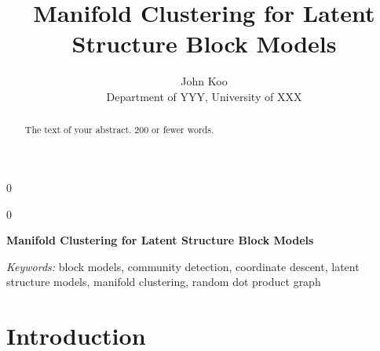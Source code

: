 \documentclass[12pt]{article}
\newcommand{\blind}{0}
\begin{document}
\def\spacingset#1{\renewcommand{\baselinestretch}%
{#1}\small\normalsize} \spacingset{1}



\blind
{
  \title{\bf Manifold Clustering for Latent Structure Block Models}

  \author{
        John Koo \\
    Department of YYY, University of XXX\\
      }
  \maketitle
} \fi

\blind
{
  \bigskip
  \bigskip
  \bigskip
  \begin{center}
    {\LARGE\bf Manifold Clustering for Latent Structure Block Models}
  \end{center}
  \medskip
} \fi

\bigskip
\begin{abstract}
The text of your abstract. 200 or fewer words.
\end{abstract}

\noindent%
{\it Keywords:} block models, community detection, coordinate descent,
latent structure models, manifold clustering, random dot product graph
\vfill

\newpage
\spacingset{1.45} %

\newcommand{\diag}{\mathrm{diag}}
\newcommand{\tr}{\mathrm{Tr}}
\newcommand{\blockdiag}{\mathrm{blockdiag}}
\newcommand{\indep}{\stackrel{\mathrm{ind}}{\sim}}
\newcommand{\iid}{\stackrel{\mathrm{iid}}{\sim}}
\newcommand{\Bernoulli}{\mathrm{Bernoulli}}
\newcommand{\Betadist}{\mathrm{Beta}}
\newcommand{\BG}{\mathrm{BernoulliGraph}}
\newcommand{\Uniform}{\mathrm{Uniform}}
\newcommand{\PABM}{\mathrm{PABM}}
\newcommand{\RDPG}{\mathrm{RDPG}}
\newcommand{\GRDPG}{\mathrm{GRDPG}}
\newcommand{\Multinomial}{\mathrm{Multinomial}}
\newtheorem{theorem}{Theorem}
\newtheorem{lemma}{Lemma}
\newtheorem{proposition}{Proposition}
\theoremstyle{remark}
\newtheorem{remark}{Remark}
\theoremstyle{definition}
\newtheorem{definition}{Definition}
\newtheorem{example}{Example}
\newcommand{\dd}{\mathrm{d}}
\newcommand{\as}{\stackrel{\mathrm{a.s.}}{\to}}

\hypertarget{introduction}{%
\section{Introduction}\label{introduction}}
\end{document}
